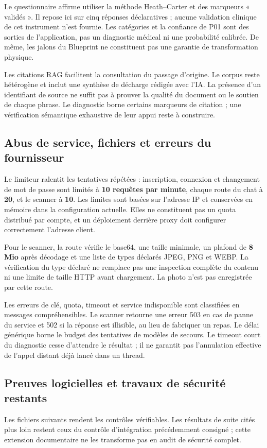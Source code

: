 Le questionnaire affirme utiliser la méthode Heath--Carter et des marqueurs « validés ». Il repose ici sur cinq réponses déclaratives ; aucune validation clinique de cet instrument n'est fournie. Les catégories et la confiance de P01 sont des sorties de l'application, pas un diagnostic médical ni une probabilité calibrée. De même, les jalons du Blueprint ne constituent pas une garantie de transformation physique.

Les citations RAG facilitent la consultation du passage d'origine. Le corpus reste hétérogène et inclut une synthèse de décharge rédigée avec l'IA. La présence d'un identifiant de source ne suffit pas à prouver la qualité du document ou le soutien de chaque phrase. Le diagnostic borne certains marqueurs de citation ; une vérification sémantique exhaustive de leur appui reste à construire.

\subsection{Abus de service, fichiers et erreurs du fournisseur}
Le limiteur ralentit les tentatives répétées : inscription, connexion et changement de mot de passe sont limités à \textbf{10 requêtes par minute}, chaque route du chat à \textbf{20}, et le scanner à \textbf{10}. Les limites sont basées sur l'adresse IP et conservées en mémoire dans la configuration actuelle. Elles ne constituent pas un quota distribué par compte, et un déploiement derrière proxy doit configurer correctement l'adresse client.

Pour le scanner, la route vérifie le base64, une taille minimale, un plafond de \textbf{8 Mio} après décodage et une liste de types déclarés JPEG, PNG et WEBP. La vérification du type déclaré ne remplace pas une inspection complète du contenu ni une limite de taille HTTP avant chargement. La photo n'est pas enregistrée par cette route.

Les erreurs de clé, quota, timeout et service indisponible sont classifiées en messages compréhensibles. Le scanner retourne une erreur 503 en cas de panne du service et 502 si la réponse est illisible, au lieu de fabriquer un repas. Le délai générique borne le budget des tentatives de modèles de secours. Le timeout court du diagnostic cesse d'attendre le résultat ; il ne garantit pas l'annulation effective de l'appel distant déjà lancé dans un thread.

\clearpage
\subsection{Preuves logicielles et travaux de sécurité restants}
Les fichiers suivants rendent les contrôles vérifiables. Les résultats de suite cités plus loin restent ceux du contrôle d'intégration précédemment consigné ; cette extension documentaire ne les transforme pas en audit de sécurité complet.

